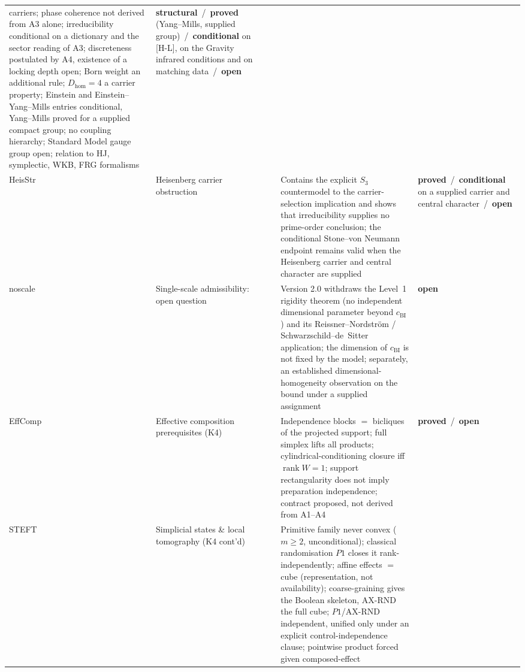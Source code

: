 \documentclass[11pt,a4paper]{article}
\newcommand{\sproved}{\textcolor{cproved}{\textbf{proved}}}
\newcommand{\sstruct}{\textcolor{cstruct}{\textbf{structural}}}
\newcommand{\sopen}{\textcolor{copen}{\textbf{open}}}
\newcommand{\scond}{\textcolor{ccond}{\textbf{conditional}}}
\begin{document}
\begin{longtable}{@{}p{1.70cm}p{2.9cm}p{1.3cm}p{6.25cm}>{\raggedright\arraybackslash}p{2.0cm}@{}}
      carriers; phase coherence not derived from A3 alone;
      irreducibility conditional on a dictionary and the sector reading of A3; discreteness postulated by A4,
      existence of a locking depth open; Born weight an additional rule;
      $D_{\mathrm{hom}}=4$ a carrier property; Einstein and Einstein--Yang--Mills entries conditional, Yang--Mills
      proved for a supplied compact group; no coupling hierarchy;
      Standard Model gauge group open; relation to HJ, symplectic, WKB, FRG formalisms &
      \sstruct\ /\ \sproved{} (Yang--Mills, supplied group)\ /\ \scond{} on [H-L], on the Gravity infrared
      conditions and on matching data\ /\ \sopen \\[3pt]
      HeisStr & Heisenberg carrier obstruction & \cite{Beau2026HeisenbergStructure} &
      Contains the explicit \(S_3\) countermodel to the carrier-selection
      implication and shows that irreducibility supplies no prime-order conclusion; the conditional Stone--von Neumann
      endpoint remains valid when the Heisenberg carrier and central character are supplied &
      \sproved\ /\ \scond{} on a supplied carrier and central character\ /\ \sopen \\[3pt]
      noscale & Single-scale admissibility: open question & \cite{Beau2026j} &
      Version 2.0 withdraws the Level~1 rigidity theorem (no independent dimensional parameter beyond
      $c_{\mathrm{BI}}$) and its Reissner--Nordstr\"om / Schwarzschild--de~Sitter application; the dimension
      of $c_{\mathrm{BI}}$ is not fixed by the model; separately, an established dimensional-homogeneity
      observation on the bound under a supplied assignment &
      \sopen \\[3pt]
      EffComp & Effective composition prerequisites (K4) & \cite{Beau2026esub} &
      Independence blocks $=$ bicliques of the projected support; full simplex lifts all products;
      cylindrical-conditioning closure iff $\operatorname{rank} W = 1$; support rectangularity does not imply
      preparation independence; contract proposed, not derived from A1--A4 &
      \sproved\ /\ \sopen \\[3pt]
      STEFT & Simplicial states \& local tomography (K4 cont'd) & \cite{Beau2026steft} &
      Primitive family never convex ($m\geq2$, unconditional); classical randomisation $P1$ closes it
      rank-independently; affine effects $=$ cube (representation, not availability); coarse-graining gives
      the Boolean skeleton, $\mathrm{AX\text{-}RND}$ the full cube; $P1$/$\mathrm{AX\text{-}RND}$ independent, unified
      only under an explicit control-independence clause; pointwise product forced given composed-effect

\end{longtable}
\end{document}
